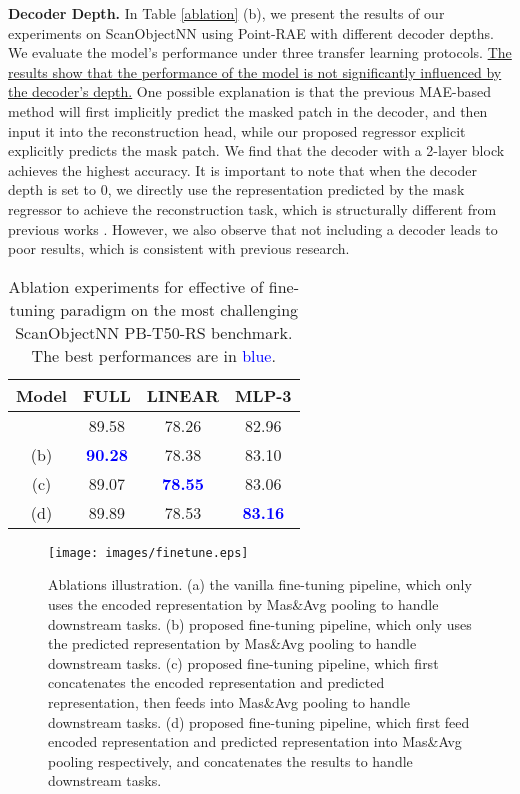 \documentclass[sigconf, screen]{acmart}
\begin{document}
\noindent \textbf{Decoder Depth.} In Table \ref{ablation} (b), we present the results of our experiments on ScanObjectNN using Point-RAE with different decoder depths. We evaluate the model's performance under three transfer learning protocols. 
\uline{The results show that the performance of the model is not significantly influenced by the decoder's depth.}
One possible explanation is that the previous MAE-based method will first implicitly predict the masked patch in the decoder, and then input it into the reconstruction head, while our proposed regressor explicit explicitly predicts the mask patch.
We find that the decoder with a 2-layer block achieves the highest accuracy. 
It is important to note that when the decoder depth is set to 0, we directly use the representation predicted by the mask regressor to achieve the reconstruction task, which is structurally different from previous works \cite{devlin2018bert, yu2022point}. 
However, we also observe that not including a decoder leads to poor results, which is consistent with previous research.




\begin{table}
\caption{
 Ablation experiments for effective of fine-tuning paradigm on the most challenging ScanObjectNN PB-T50-RS benchmark. 
The best performances are in \textcolor{blue}{blue}.
}
\centering
\setlength{\tabcolsep}{5.5mm}
\begin{tabular}{@{}cccc}
\toprule[1pt]
 Model & FULL  & LINEAR & MLP-3 \\
\midrule[0.5pt]
(a) &89.58  &78.26  &82.96\\
(b) & \textcolor{blue}{\bf90.28} & 78.38& 83.10\\
(c) &89.07& \textcolor{blue}{\bf78.55}& 83.06\\
 (d) &89.89& 78.53 & \textcolor{blue}{\bf83.16}\\
\bottomrule[1pt]

\end{tabular}
\label{tab:finetune}
\end{table}


\begin{figure*}[t]
  \centering
  \texttt{[image: images/finetune.eps]}
  \caption{Ablations illustration.
(a)  the vanilla fine-tuning pipeline, which only uses the encoded representation by Mas\&Avg pooling to handle downstream tasks.
(b) proposed fine-tuning pipeline, which only uses the predicted representation by Mas\&Avg pooling to handle downstream tasks.
(c) proposed fine-tuning pipeline, which first concatenates the encoded representation and predicted representation, then feeds into Mas\&Avg pooling to handle downstream tasks.
(d) proposed fine-tuning pipeline,  which first feed encoded representation and predicted representation into Mas\&Avg pooling respectively, and concatenates the results to handle downstream tasks.}
  \label{finetune}
\end{figure*}
\end{document}
